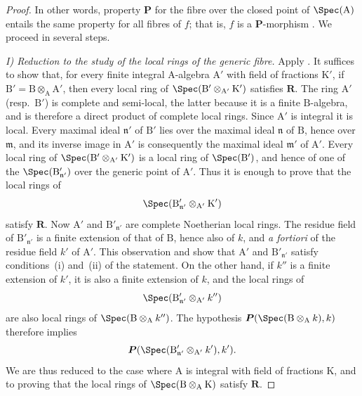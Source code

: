 \begin{proof}
In other words, property $\boldsymbol{P}$ for the fibre over the closed point of $\Spec(\mathrm{A})$ entails the same property for all fibres of $f$; that is, $f$ is a $\boldsymbol{P}$-morphism . We proceed in several steps.

\emph{I) Reduction to the study of the local rings of the generic fibre.} Apply . It suffices to show that, for every finite integral $\mathrm{A}$-algebra $\mathrm{A}'$ with field of fractions $\mathrm{K}'$, if $\mathrm{B}'=\mathrm{B}\otimes_\mathrm{A}\mathrm{A}'$, then every local ring of $\Spec(\mathrm{B}'\otimes_{\mathrm{A}'}\mathrm{K}')$ satisfies $\boldsymbol{R}$. The ring $\mathrm{A}'$ (resp.\ $\mathrm{B}'$) is complete and semi-local, the latter because it is a finite $\mathrm{B}$-algebra, and is therefore a direct product of complete local rings. Since $\mathrm{A}'$ is integral it is local. Every maximal ideal $\mathfrak{n}'$ of $\mathrm{B}'$ lies over the maximal ideal $\mathfrak{n}$ of $\mathrm{B}$, hence over $\mathfrak{m}$, and its inverse image in $\mathrm{A}'$ is consequently the maximal ideal $\mathfrak{m}'$ of $\mathrm{A}'$. Every local ring of $\Spec(\mathrm{B}'\otimes_{\mathrm{A}'}\mathrm{K}')$ is a local ring of $\Spec(\mathrm{B}')$, and hence of one of the $\Spec(\mathrm{B}'_{\mathfrak{n}'})$ over the generic point of $\mathrm{A}'$. Thus it is enough to prove that the local rings of
\[
  \Spec(\mathrm{B}'_{\mathfrak{n}'}\otimes_{\mathrm{A}'}\mathrm{K}')
\]
satisfy $\boldsymbol{R}$. Now $\mathrm{A}'$ and $\mathrm{B}'_{\mathfrak{n}'}$ are complete Noetherian local rings. The residue field of $\mathrm{B}'_{\mathfrak{n}'}$ is a finite extension of that of $\mathrm{B}$, hence also of $k$, and \emph{a fortiori} of the residue field $k'$ of $\mathrm{A}'$. This observation and  show that $\mathrm{A}'$ and $\mathrm{B}'_{\mathfrak{n}'}$ satisfy conditions~(i) and~(ii) of the statement. On the other hand, if $k''$ is a finite extension of $k'$, it is also a finite extension of $k$, and the local rings of
\[
  \Spec(\mathrm{B}'_{\mathfrak{n}'}\otimes_{\mathrm{A}'}k'')
\]
are also local rings of $\Spec(\mathrm{B}\otimes_\mathrm{A}k'')$. The hypothesis $\boldsymbol{P}(\Spec(\mathrm{B}\otimes_\mathrm{A}k),k)$ therefore implies
\[
  \boldsymbol{P}(\Spec(\mathrm{B}'_{\mathfrak{n}'}\otimes_{\mathrm{A}'}k'),k').
\]
We are thus reduced to the case where $\mathrm{A}$ is integral with field of fractions $\mathrm{K}$, and to proving that the local rings of $\Spec(\mathrm{B}\otimes_\mathrm{A}\mathrm{K})$ satisfy $\boldsymbol{R}$.


\end{proof}
